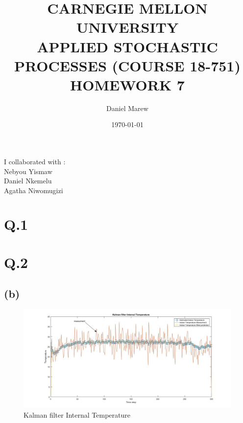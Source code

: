 \documentclass[a4paper,11pt]{article}
\begin{document}
\title{\color{red}CARNEGIE MELLON UNIVERSITY\\
APPLIED STOCHASTIC PROCESSES  (COURSE 18-751)\\
HOMEWORK 7}
\author{Daniel Marew}
\date{\today}
\clearpage\maketitle

\thispagestyle{empty}
\newpage
I collaborated with :\\
\hspace*{6cm}
Nebyou Yismaw\\
\hspace*{6cm}
Daniel    Nkemelu\\
\hspace*{6cm}
Agatha Niwomugizi
\thispagestyle{empty}
\newpage
\clearpage
\setcounter{page}{1}
\section*{Q.1}
\newpage
\clearpage
\section*{Q.2}
\subsection*{(b)}
\begin{figure}[h]
  \hspace*{-6cm}
   \includegraphics[scale=0.5]{q2_1}
   \caption{Kalman filter Internal Temperature}\label{fig:q2_1}
\end{figure}
\end{document}

